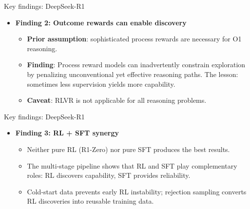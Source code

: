 \begin{frame}{Key findings: DeepSeek-R1}
  \begin{itemize}
    \item<1-> \textcolor{KAred}{\textbf{Finding 2: Outcome rewards can enable discovery}}
    \begin{itemize}
      \item \textbf{Prior assumption}: sophisticated process rewards are necessary for O1 reasoning.
      \item \textbf{Finding}: Process reward models can inadvertently constrain exploration by penalizing unconventional yet effective reasoning paths. The lesson: sometimes less supervision yields more capability.
      \item \textbf{Caveat}: RLVR is not applicable for all reasoning problems.
    \end{itemize}
  \end{itemize}
\end{frame}

\begin{frame}{Key findings: DeepSeek-R1}
  \begin{itemize}
    \item<1-> \textcolor{KAred}{\textbf{Finding 3: RL + SFT synergy}}
    \begin{itemize}
      \item Neither pure RL (R1-Zero) nor pure SFT produces the best results.
      \item The multi-stage pipeline shows that RL and SFT play complementary roles: RL discovers capability, SFT provides reliability.
      \item Cold-start data prevents early RL instability; rejection sampling converts RL discoveries into reusable training data.
    \end{itemize}
  \end{itemize}
\end{frame}

